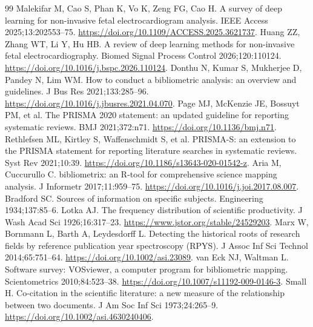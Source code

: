\begin{thebibliography}{99}
 Malekifar M, Cao S, Phan K, Vo K, Zeng FG, Cao H. A survey of deep learning for non-invasive fetal electrocardiogram analysis. IEEE Access 2025;13:202553--75. \href{https://doi.org/10.1109/ACCESS.2025.3621737}{https://doi.org/10.1109/ACCESS.2025.3621737}.
 Huang ZZ, Zhang WT, Li Y, Hu HB. A review of deep learning methods for non-invasive fetal electrocardiography. Biomed Signal Process Control 2026;120:110124. \href{https://doi.org/10.1016/j.bspc.2026.110124}{https://doi.org/10.1016/j.bspc.2026.110124}.
 Donthu N, Kumar S, Mukherjee D, Pandey N, Lim WM. How to conduct a bibliometric analysis: an overview and guidelines. J Bus Res 2021;133:285--96. \href{https://doi.org/10.1016/j.jbusres.2021.04.070}{https://doi.org/10.1016/j.jbusres.2021.04.070}.
 Page MJ, McKenzie JE, Bossuyt PM, et al. The PRISMA 2020 statement: an updated guideline for reporting systematic reviews. BMJ 2021;372:n71. \href{https://doi.org/10.1136/bmj.n71}{https://doi.org/10.1136/bmj.n71}.
 Rethlefsen ML, Kirtley S, Waffenschmidt S, et al. PRISMA-S: an extension to the PRISMA statement for reporting literature searches in systematic reviews. Syst Rev 2021;10:39. \href{https://doi.org/10.1186/s13643-020-01542-z}{https://doi.org/10.1186/s13643-020-01542-z}.
 Aria M, Cuccurullo C. bibliometrix: an R-tool for comprehensive science mapping analysis. J Informetr 2017;11:959--75. \href{https://doi.org/10.1016/j.joi.2017.08.007}{https://doi.org/10.1016/j.joi.2017.08.007}.
 Bradford SC. Sources of information on specific subjects. Engineering 1934;137:85--6.
 Lotka AJ. The frequency distribution of scientific productivity. J Wash Acad Sci 1926;16:317--23. \url{https://www.jstor.org/stable/24529203}.
 Marx W, Bornmann L, Barth A, Leydesdorff L. Detecting the historical roots of research fields by reference publication year spectroscopy (RPYS). J Assoc Inf Sci Technol 2014;65:751--64. \href{https://doi.org/10.1002/asi.23089}{https://doi.org/10.1002/asi.23089}.
 van Eck NJ, Waltman L. Software survey: VOSviewer, a computer program for bibliometric mapping. Scientometrics 2010;84:523--38. \href{https://doi.org/10.1007/s11192-009-0146-3}{https://doi.org/10.1007/s11192-009-0146-3}.
 Small H. Co-citation in the scientific literature: a new measure of the relationship between two documents. J Am Soc Inf Sci 1973;24:265--9. \href{https://doi.org/10.1002/asi.4630240406}{https://doi.org/10.1002/asi.4630240406}.

\end{thebibliography}
